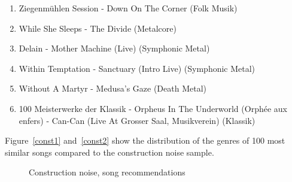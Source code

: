\begin{enumerate}
	\setlength\itemsep{-0.5em}
	\item Ziegenm\"uhlen Session - Down On The Corner (Folk Musik)
	\item While She Sleeps - The Divide (Metalcore)
	\item Delain - Mother Machine (Live) (Symphonic Metal)
	\item Within Temptation - Sanctuary (Intro Live) (Symphonic Metal)
	\item Without A Martyr - Medusa's Gaze (Death Metal)
	\item 100 Meisterwerke der Klassik - Orpheus In The Underworld (Orph\'ee aux enfers) - Can-Can (Live At Grosser Saal, Musikverein) (Klassik)
\end{enumerate}

\noindent Figure~\ref{const1} and~\ref{const2} show the distribution of the genres of 100 most similar songs compared to the construction noise sample.  

\begin{figure}[htbp]
	\centering
	\caption{Construction noise, song recommendations}
	\label{fig:constn}
\end{figure}

